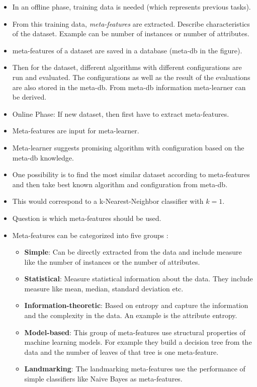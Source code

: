 \begin{itemize}
    \item In an offline phase, training data is needed (which represents previous tasks).
    \item From this training data, \textit{meta-features} are extracted.
    Describe characteristics of the dataset.
    Example can be number of instances or number of attributes.
    \item meta-features of a dataset are saved in a database (meta-db in the figure).
    \item Then for the dataset, different algorithms with different configurations are run and evaluated.
    The configurations as well as the result of the evaluations are also stored in the meta-db.
    From meta-db information meta-learner can be derived.
    \item Online Phase: If new dataset, then first have to extract meta-features.
    \item Meta-features are input for meta-learner.
    \item Meta-learner suggests promising algorithm with configuration based on the meta-db knowledge.
    \item One possibility is to find the most similar dataset according to meta-features and then take best known algorithm and configuration from meta-db.
    \item This would correspond to a k-Nearest-Neighbor classifier with $k=1$.
    \item Question is which meta-features should be used.
    \item Meta-features can be categorized into five groups \cite{Rivolli2018TowardsMeta-learning}:
    \begin{itemize}
        \item \textbf{Simple}: Can be directly extracted from the data and include measure like the number of instances or the number of attributes.
        \item \textbf{Statistical}: Measure statistical information about the data.
        They include measure like mean, median, standard deviation etc.
        \item \textbf{Information-theoretic}: Based on entropy and capture the information and the complexity in the data.
        An example is the attribute entropy.
        \item \textbf{Model-based}: This group of meta-features use structural properties of machine learning models.
        For example they build a decision tree from the data and the number of leaves of that tree is one meta-feature.
        \item \textbf{Landmarking}: The landmarking meta-features use the performance of simple classifiers like Naive Bayes as meta-features.
    \end{itemize}
    

\end{itemize}

